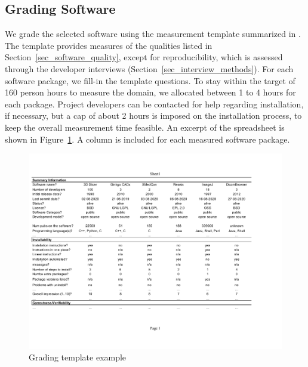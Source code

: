 \documentclass[final, 3p, times, authoryear]{elsarticle}
\begin{document}
\subsection{Grading Software} \label{sec_grading_software}

We grade the selected software using the measurement template summarized in
\citet{SmithEtAl2021}.  The template provides measures of the qualities listed
in Section~\ref{sec_software_quality}, except for reproducibility, which is
assessed through the developer interviews (Section~\ref{sec_interview_methods}).
For each software package, we fill-in the template questions. To stay within the
target of 160 person hours to measure the domain, we allocated between 1 to 4
hours for each package. Project developers can be contacted for help regarding
installation, if necessary, but a cap of about 2 hours is imposed on the
installation process, to keep the overall measurement time feasible. An excerpt
of the spreadsheet is shown in Figure~\ref{fg_grading_template_example}.  A
column is included for each measured software package. 

\begin{figure}[!ht]
\includegraphics[scale=0.67]{figures/template.pdf}
\caption{Grading template example}
\label{fg_grading_template_example}
\end{figure}
\end{document}
